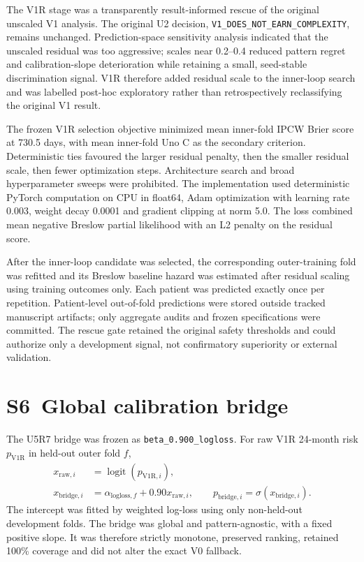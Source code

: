 The V1R stage was a transparently result-informed rescue of the original unscaled V1 analysis. The original U2 decision, \texttt{V1\_DOES\_NOT\_EARN\_COMPLEXITY}, remains unchanged. Prediction-space sensitivity analysis indicated that the unscaled residual was too aggressive; scales near 0.2--0.4 reduced pattern regret and calibration-slope deterioration while retaining a small, seed-stable discrimination signal. V1R therefore added residual scale to the inner-loop search and was labelled post-hoc exploratory rather than retrospectively reclassifying the original V1 result.

The frozen V1R selection objective minimized mean inner-fold IPCW Brier score at 730.5 days, with mean inner-fold Uno C as the secondary criterion. Deterministic ties favoured the larger residual penalty, then the smaller residual scale, then fewer optimization steps. Architecture search and broad hyperparameter sweeps were prohibited. The implementation used deterministic PyTorch computation on CPU in float64, Adam optimization with learning rate 0.003, weight decay 0.0001 and gradient clipping at norm 5.0. The loss combined mean negative Breslow partial likelihood with an L2 penalty on the residual score.

After the inner-loop candidate was selected, the corresponding outer-training fold was refitted and its Breslow baseline hazard was estimated after residual scaling using training outcomes only. Each patient was predicted exactly once per repetition. Patient-level out-of-fold predictions were stored outside tracked manuscript artifacts; only aggregate audits and frozen specifications were committed. The rescue gate retained the original safety thresholds and could authorize only a development signal, not confirmatory superiority or external validation.

\section*{S6~Global calibration bridge}
The U5R7 bridge was frozen as \texttt{beta\_0.900\_logloss}. For raw V1R 24-month risk $p_{\mathrm{V1R}}$ in held-out outer fold $f$,
\begin{align}
x_{\mathrm{raw},i}&=\operatorname{logit}(p_{\mathrm{V1R},i}),\\
x_{\mathrm{bridge},i}&=\alpha_{\mathrm{logloss},f}+0.90x_{\mathrm{raw},i},\qquad
p_{\mathrm{bridge},i}=\sigma(x_{\mathrm{bridge},i}).
\end{align}
The intercept was fitted by weighted log-loss using only non-held-out development folds. The bridge was global and pattern-agnostic, with a fixed positive slope. It was therefore strictly monotone, preserved ranking, retained 100\% coverage and did not alter the exact V0 fallback.


